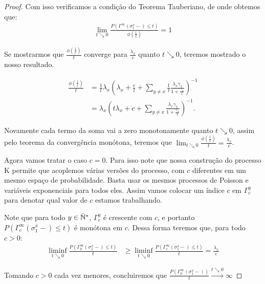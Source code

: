 \begin{proof}
  Com isso verificamos a condição do Teorema Tauberiano, de onde
  obtemos que:
  \begin{align*}
    \lim_{t \searrow 0} \frac{P( \Gamma^\infty(\sigma^x_1-) \leq
      t)}{\phi(\frac{1}{t})} = 1
  \end{align*}

  Se mostrarmos que $\frac{\phi(\frac{1}{t})}{t}$ converge para
  $\frac{\lambda_x}{c}$ quanto $t \searrow 0$, teremos mostrado o
  nosso resultado.

  \begin{align*}
    \frac{\phi(\frac{1}{t})}{t} &= \frac{1}{t} \lambda_x \left(
      \lambda_x + \frac{c}{t} + \sum_{y \neq x} \frac{1}{t}
      \frac{\lambda_x \gamma_x}{1 + \frac{\gamma_x}{t}} \right)^{-1} \\
    &= \lambda_x \left( t\lambda_x + c + \sum_{y \neq x}
      \frac{\lambda_x \gamma_x}{1 + \frac{\gamma_x}{t}} \right)^{-1}.
  \end{align*}

  Novamente cada termo da soma vai a zero monotonamente quanto $t
  \searrow 0$, assim pelo teorema da convergência monótona, teremos que
  $\lim_{t \searrow 0} \frac{\phi(\frac{1}{t})}{t} =
  \frac{\lambda_x}{c}$.

  Agora vamos tratar o caso $c = 0$. Para isso note que nossa
  construção do processo K permite que acoplemos várias versões do
  processo, com $c$ diferentes em um mesmo espaço de
  probabilidade. Basta usar os mesmos processos de Poisson e variáveis
  exponenciais para todos eles. Assim vamos colocar um índice $c$ em
  $\Gamma^y_c$ para denotar qual valor de $c$ estamos trabalhando.

  Note que para todo $y \in {\mathbb{\bar{N}^*}}$, $\Gamma^y_c$ é crescente com $c$, e
  portanto $P ( \Gamma^\infty_c(\sigma^x_1-) \leq t)$ é monótona em
  $c$.  Dessa forma teremos que, para todo $c > 0$:
  \begin{align*}
    \liminf_{t \searrow 0} \frac{P ( \Gamma^\infty_0(\sigma^x_1-) \leq
      t)}{t} &\geq \liminf_{t \searrow 0} \frac{P (
      \Gamma^\infty_c(\sigma^x_1-) \leq t)}{t}
    = \frac{\lambda_x}{c}
  \end{align*}

  Tomando $c > 0$ cada vez menores, concluiremos que $\frac{P (
    \Gamma^\infty_0(\sigma^x_1-))}{t} \xrightarrow{t \searrow 0}
  \infty$
\end{proof}

